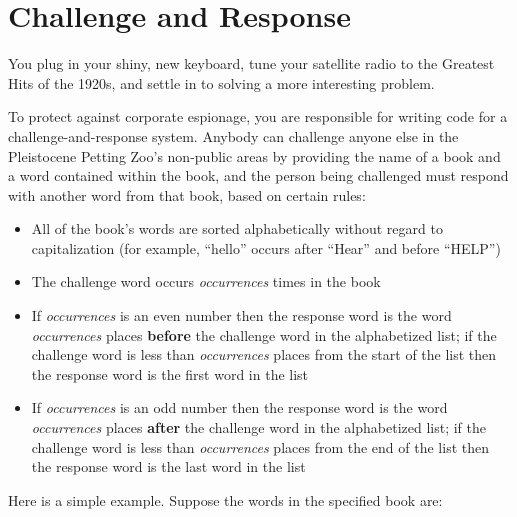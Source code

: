 \section{Challenge and Response}

You plug in your shiny, new keyboard, tune your satellite radio to the
Greatest Hits of the 1920s, and settle in to solving a more interesting problem.

To protect against corporate espionage, you are responsible for writing code
for a challenge-and-response system. Anybody can challenge anyone else in the
Pleistocene Petting Zoo's non-public areas by providing the name of a book and
a word contained within the book, and the person being challenged must respond
with another word from that book, based on certain rules:
\begin{itemize}
\item All of the book's words are sorted alphabetically without regard to
    capitalization (for example, ``hello'' occurs after ``Hear'' and before
    ``HELP'')
\item The challenge word occurs \textit{occurrences} times in the book
\item If \textit{occurrences} is an even number then the response word is the
    word \textit{occurrences} places \textbf{before} the challenge word in the
    alphabetized list; if the challenge word is less than \textit{occurrences}
    places from the start of the list then the response word is the first word
    in the list
\item If \textit{occurrences} is an odd number then the response word is the
    word \textit{occurrences} places \textbf{after} the challenge word in the
    alphabetized list; if the challenge word is less than \textit{occurrences}
    places from the end of the list then the response word is the last word
    in the list
\end{itemize}

Here is a simple example. Suppose the words in the specified book are:

